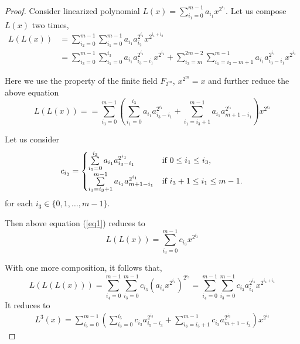 \documentclass[12pt,a4paper]{article}
\begin{document}
\begin{proof}
	 Consider linearized polynomial $ L(x)=\sum\limits_{i_1=0}^{m-1}a_{i_1}x^{2^{i_1}} $. Let us compose $L(x)$ two times,
    \begin{equation}
    \begin{split}
        L(L(x))&=\sum\limits_{i_2=0}^{m-1}\sum\limits_{i_1=0}^{m-1}a_{i_1}a_{i_2}^{2^{i_1}}x^{2^{i_1+i_2}}\\&=\sum\limits_{i_3=0}^{m-1}\sum\limits_{i_1=0}^{i_3}a_{i_1}a_{i_3-i_1}^{2^{i_1}}x^{2^{i_3}}+\sum\limits_{i_3=m}^{2m-2}\sum\limits_{i_1=i_3-m+1}^{m-1}a_{i_1}a_{i_3-i_1}^{2^{i_1}}x^{2^{i_3}}
    \end{split}
    \end{equation}

    Here we use the property of the finite field $ F_{2^{m}} $, $x^{2^m}=x$ and further reduce the above equation \begin{equation}\label{eq1}
        L(L(x))==\sum\limits_{i_3=0}^{m-1}\left(\sum\limits_{i_1=0}^{i_3}a_{i_1}a_{i_3-i_1}^{2^{i_1}}+\sum\limits_{i_1=i_3+1}^{m-1}a_{i_1}a_{m+1-i_1}^{2^{i_1}}\right)x^{2^{i_3}}
    \end{equation}
    
    Let us consider \begin{equation}
        c_{i_3} = \begin{cases}
    \sum\limits_{i_1=0}^{i_3}a_{i_1}a_{i_3-i_1}^{2^{i_1}} & $\text{if $ 0\leq i_1\leq i_3 $}$,\\
    \sum\limits_{i_1=i_3+1}^{m-1}a_{i_1}a_{m+1-i_1}^{2^{i_1}} & $\text{if $i_3+1\leq i_1\leq m-1$}$.
		\end{cases}
    \end{equation}
    for each $i_3\in \{0,1,\ldots,m-1\} $.  

   
    Then above equation (\ref{eq1}) reduces to
    \begin{equation}
        L(L(x))=\sum\limits_{i_3=0}^{m-1}c_{i_3}x^{2^{i_3}}
    \end{equation}
    
	With one more composition, it follows that,
	\begin{equation}
		L(L(L(x)))=\sum\limits_{i_4=0}^{m-1}\sum\limits_{i_3=0}^{m-1}c_{i_3}(a_{i_4}x^{2^{i_4}})^{2^{i_3}}=\sum\limits_{i_4=0}^{m-1}\sum\limits_{i_3=0}^{m-1}c_{i_3}a_{i_4}^{2^{i_3}}x^{2^{i_4+i_3}}
	\end{equation}
    It reduces to
    \begin{equation}\label{eq2}
        \begin{split}
            L^3(x)=\sum\limits_{i_5=0}^{m-1}\left(\sum\limits_{i_3=0}^{i_5}c_{i_3}a_{i_5-i_3}^{2^{i_3}}+\sum\limits_{i_3=i_5+1}^{m-1}c_{i_3}a_{m+1-i_3}^{2^{i_3}}\right)x^{2^{i_5}}
        \end{split}
    \end{equation}
    

\end{proof}
\end{document}
